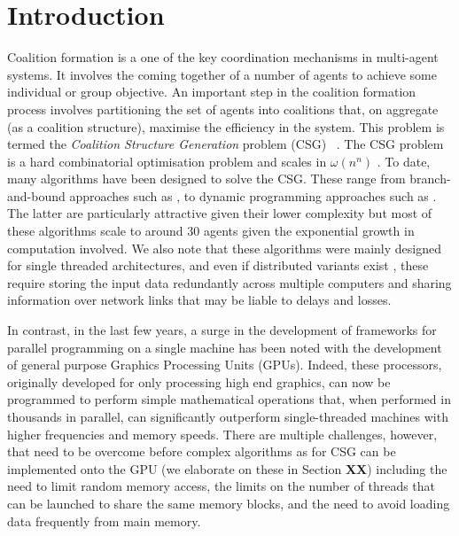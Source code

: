 \documentclass{llncs}
\begin{document}
\section{Introduction}
\noindent Coalition formation is a one of the key coordination mechanisms in
multi-agent systems. It involves the coming together of a number of  agents to
achieve some individual or group objective.  An important step in the 
 coalition formation process involves partitioning the set of agents into coalitions that, on aggregate (as a coalition structure), maximise the efficiency in the system. This problem is termed the 
\emph{Coalition Structure Generation} problem (CSG)
~\cite{DBLP:journals/ai/SandholmLAST99}.   The  CSG problem is a hard combinatorial optimisation problem and scales in $\omega(n^n)$ \cite{DBLP:journals/ai/SandholmLAST99}. To date, many algorithms have been designed to solve the CSG. These range from branch-and-bound approaches such as \cite{rahwan2009anytime}, to dynamic programming approaches such as
\cite{DBLP:conf/atal/RahwanJ08,rahwan:jennings:2008b}. The latter are particularly attractive given their lower complexity but most of these algorithms scale to around 30 agents given the exponential growth in computation involved. We also note that these algorithms were mainly designed for single threaded architectures, and even if distributed variants exist \cite{distcsg}, these require storing the input data redundantly across multiple computers and sharing information over network links that may be liable to delays and losses. 

In contrast, in the last few years, a surge in the development of frameworks for parallel programming on a single machine has been noted with the development of general purpose Graphics Processing Units (GPUs). Indeed, these processors, originally developed for only processing high end graphics, can now be programmed to perform simple mathematical operations that, when performed in thousands in parallel, can significantly outperform single-threaded machines with higher frequencies and memory speeds. There are multiple challenges, however, that need to be overcome before complex algorithms as for CSG can be implemented onto the GPU (we elaborate on these in Section \textbf{XX}) including the need to limit random memory access,  the limits on the number of threads that can be launched to share the same memory blocks, and the need to avoid loading data frequently from main memory. 
\end{document}
